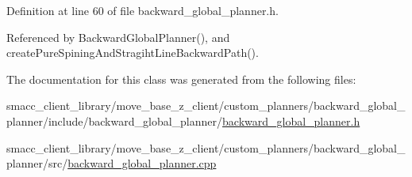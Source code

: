 Definition at line 60 of file backward\+\_\+global\+\_\+planner.\+h.



Referenced by Backward\+Global\+Planner(), and create\+Pure\+Spining\+And\+Stragiht\+Line\+Backward\+Path().



The documentation for this class was generated from the following files\+:\begin{DoxyCompactItemize}
\item 
smacc\+\_\+client\+\_\+library/move\+\_\+base\+\_\+z\+\_\+client/custom\+\_\+planners/backward\+\_\+global\+\_\+planner/include/backward\+\_\+global\+\_\+planner/\hyperlink{backward__global__planner_8h}{backward\+\_\+global\+\_\+planner.\+h}\item 
smacc\+\_\+client\+\_\+library/move\+\_\+base\+\_\+z\+\_\+client/custom\+\_\+planners/backward\+\_\+global\+\_\+planner/src/\hyperlink{backward__global__planner_8cpp}{backward\+\_\+global\+\_\+planner.\+cpp}\end{DoxyCompactItemize}
